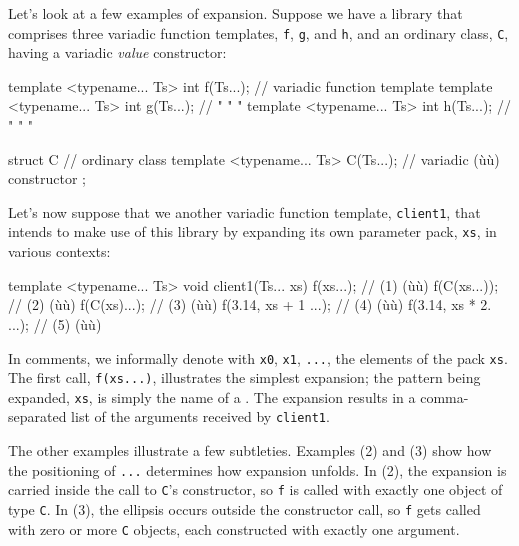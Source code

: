 Let's look at a few examples of expansion. Suppose we have a library
that comprises three variadic function templates, \lstinline!f!,
\lstinline!g!, and \lstinline!h!, and an ordinary class, \lstinline!C!, having a
variadic \emph{value} constructor:

\begin{emcppslisting}[emcppsbatch=e27]
template <typename... Ts> int f(Ts...);  // variadic function template
template <typename... Ts> int g(Ts...);  //    "        "        "
template <typename... Ts> int h(Ts...);  //    "        "        "

struct C                                 // ordinary class
{
    template <typename... Ts> C(Ts...);  // variadic (ù{}ù) constructor
};
\end{emcppslisting}
    

\noindent Let's now suppose that we another variadic function template,
\lstinline!client1!, that intends to make use of this library by expanding
its own parameter pack, \lstinline!xs!, in various contexts:

\begin{emcppslisting}[emcppsbatch=e27]
template <typename... Ts>
void client1(Ts... xs)
{
    f(xs...);                   // (1) (ù{}ù)
    f(C(xs...));                // (2) (ù{}ù)
    f(C(xs)...);                // (3) (ù{}ù)
    f(3.14, xs + 1 ...);        // (4) (ù{}ù)
    f(3.14, xs * 2. ...);       // (5) (ù{}ù)
}
\end{emcppslisting}
    

\noindent In comments, we informally denote with \lstinline!x0!, \lstinline!x1!,
\lstinline!...!, the elements of the pack \lstinline!xs!. The first call,
\lstinline!f(xs...)!, illustrates the simplest expansion; the pattern being
expanded, \lstinline!xs!, is simply the name of a . The expansion results in a comma-separated list of the
arguments received by \lstinline!client1!.

The other examples illustrate a few subtleties. Examples (2) and (3)
show how the positioning of \lstinline!...! determines how expansion
unfolds. In (2), the expansion is carried inside the call to
\lstinline!C!'s constructor, so \lstinline!f! is called with exactly one
object of type \lstinline!C!. In (3), the ellipsis occurs outside the
constructor call, so \lstinline!f! gets called with zero or more \lstinline!C!
objects, each constructed with exactly one argument.

